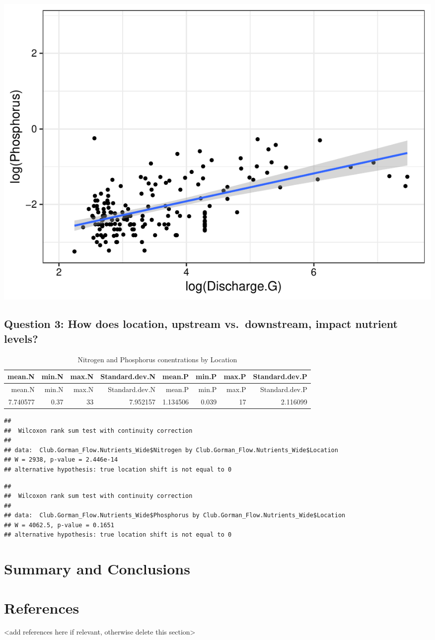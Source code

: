 \documentclass[12pt,]{article}
\begin{document}
\includegraphics{Landman_ENV872_Project_files/figure-latex/unnamed-chunk-9-2.pdf}

\hypertarget{question-3-how-does-location-upstream-vs.downstream-impact-nutrient-levels}{%
\subsection{Question 3: How does location, upstream vs.~downstream,
impact nutrient
levels?}\label{question-3-how-does-location-upstream-vs.downstream-impact-nutrient-levels}}

\begin{longtable}[]{@{}rrrrrrrr@{}}
\caption{Nitrogen and Phosphorus conentrations by
Location}\tabularnewline
\toprule
mean.N & min.N & max.N & Standard.dev.N & mean.P & min.P & max.P &
Standard.dev.P\tabularnewline
\midrule
\endfirsthead
\toprule
mean.N & min.N & max.N & Standard.dev.N & mean.P & min.P & max.P &
Standard.dev.P\tabularnewline
\midrule
\endhead
7.740577 & 0.37 & 33 & 7.952157 & 1.134506 & 0.039 & 17 &
2.116099\tabularnewline
\bottomrule
\end{longtable}

\begin{verbatim}
## 
##  Wilcoxon rank sum test with continuity correction
## 
## data:  Club.Gorman_Flow.Nutrients_Wide$Nitrogen by Club.Gorman_Flow.Nutrients_Wide$Location
## W = 2938, p-value = 2.446e-14
## alternative hypothesis: true location shift is not equal to 0
\end{verbatim}

\begin{verbatim}
## 
##  Wilcoxon rank sum test with continuity correction
## 
## data:  Club.Gorman_Flow.Nutrients_Wide$Phosphorus by Club.Gorman_Flow.Nutrients_Wide$Location
## W = 4062.5, p-value = 0.1651
## alternative hypothesis: true location shift is not equal to 0
\end{verbatim}

\newpage

\hypertarget{summary-and-conclusions}{%
\section{Summary and Conclusions}\label{summary-and-conclusions}}

\newpage

\hypertarget{references}{%
\section{References}\label{references}}

\textless{}add references here if relevant, otherwise delete this
section\textgreater{}
\end{document}
